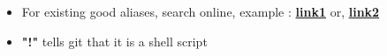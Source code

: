 \documentclass{report}
\begin{document}
\begin{itemize}
	\item For existing good aliases, search online, example : \href{https://www.durdn.com/blog/2012/11/22/must-have-git-aliases-advanced-examples/}{\textbf{link1}} or, \href{https://github.com/GitAlias/gitalias}{\textbf{link2}}  
	\item \textbf{"!"} tells git that it is a shell script
\end{itemize}
\end{document}
